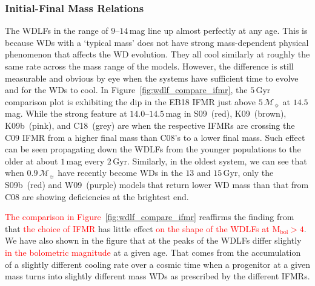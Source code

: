 \documentclass[fleqn,usenatbib]{rasti}
\newcommand{\msun}{\mathcal{M}_{\sun}}
\begin{document}
\subsubsection{Initial-Final Mass Relations}
The WDLFs in the range of $9$--$14$\,mag line up almost perfectly at any age.
This is because WDs with a `typical mass' does not have strong mass-dependent
physical phenomenon that affects the WD evolution. They all cool similarly at
roughly the same rate across the mass range of the models. However, the
difference is still measurable and obvious by eye when the systems have
sufficient time to evolve and for the WDs to cool. In 
Figure~\ref{fig:wdlf_compare_ifmr}, the $5$\,Gyr comparison plot is exhibiting
the dip in the EB18 IFMR just above $5\,\msun$ at $14.5$\,mag. While the strong
feature at $14.0$--$14.5$\,mag in S09~(red), K09~(brown), K09b~(pink), and
C18~(grey) are when the respective IFMRs are crossing the C09 IFMR from a higher
final mass than C08's to a lower final mass. Such effect can be seen propagating
down the WDLFs from the younger populations to the older at about $1$\,mag every
$2$\,Gyr. Similarly, in the oldest system, we can see that when $0.9\,\msun$
have recently become WDs in the $13$ and $15$\,Gyr, only the S09b~(red) and
W09~(purple) models that return lower WD mass than that from C08 are showing
deficiencies at the brightest end. 

\textcolor{red}{The comparison in Figure~\ref{fig:wdlf_compare_ifmr}} reaffirms
the finding from \citet{2008MNRAS.387.1693C} that
\textcolor{red}{the choice of IFMR} has little effect \textcolor{red}{on the
shape of the WDLFs at $\mathrm{M}_{\mathrm{bol}}>4$}.
We have also shown in the figure that at the peaks of the WDLFs differ slightly
\textcolor{red}{in the bolometric magnitude} at a given age. That comes from the
accumulation of a slightly different cooling rate over a cosmic time when a
progenitor at a given mass turns into slightly different mass WDs as prescribed
by the different IFMRs.
 
\end{document}
